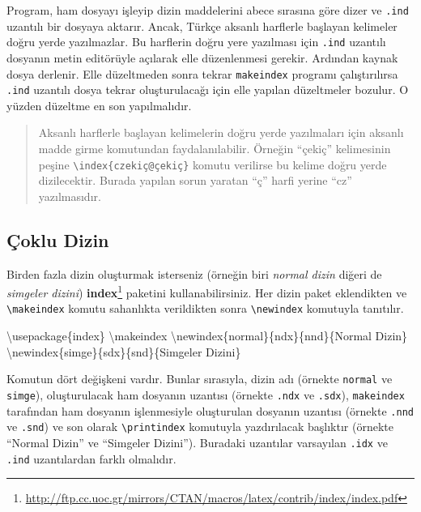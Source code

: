 \documentclass[
  10pt,
]{scrbook}
\newenvironment{Shaded}{\begin{snugshade}}{\end{snugshade}}
\newcommand{\BuiltInTok}[1]{#1}
\newcommand{\ExtensionTok}[1]{#1}
\newcommand{\FunctionTok}[1]{\textcolor[rgb]{0.00,0.00,0.00}{#1}}
\newcommand{\NormalTok}[1]{#1}
\renewcommand{\href}[2]{#2\footnote{\url{#1}}}
\theoremstyle{definition}
\theoremstyle{definition}
\theoremstyle{definition}
\theoremstyle{definition}
\theoremstyle{remark}
\begin{document}
Program, ham dosyayı işleyip dizin maddelerini abece sırasına göre dizer ve \texttt{.ind} uzantılı bir dosyaya aktarır. Ancak, Türkçe aksanlı harflerle başlayan kelimeler doğru yerde yazılmazlar. Bu harflerin doğru yere yazılması için \texttt{.ind} uzantılı dosyanın metin editörüyle açılarak elle düzenlenmesi gerekir. Ardından kaynak dosya derlenir. Elle düzeltmeden sonra tekrar \texttt{makeindex} programı çalıştırılırsa \texttt{.ind} uzantılı dosya tekrar oluşturulacağı için elle yapılan düzeltmeler bozulur. O yüzden düzeltme en son yapılmalıdır.

\begin{quote}
Aksanlı harflerle başlayan kelimelerin doğru yerde yazılmaları için aksanlı madde girme komutundan faydalanılabilir. Örneğin ``çekiç'' kelimesinin peşine \texttt{\textbackslash{}index\{czekiç@çekiç\}} komutu verilirse bu kelime doğru yerde dizilecektir. Burada yapılan sorun yaratan ``ç'' harfi yerine ``cz'' yazılmasıdır.
\end{quote}

\hypertarget{uxe7oklu-dizin}{%
\subsection{Çoklu Dizin}\label{uxe7oklu-dizin}}

Birden fazla dizin oluşturmak isterseniz (örneğin biri \emph{normal dizin} diğeri de \emph{simgeler dizini}) \href{http://ftp.cc.uoc.gr/mirrors/CTAN/macros/latex/contrib/index/index.pdf}{\textbf{index}} paketini kullanabilirsiniz. Her dizin paket eklendikten ve \texttt{\textbackslash{}makeindex} komutu sahanlıkta verildikten sonra \texttt{\textbackslash{}newindex} komutuyla tanıtılır.

\begin{Shaded}
\begin{Highlighting}[]
\BuiltInTok{\textbackslash{}usepackage}\NormalTok{\{}\ExtensionTok{index}\NormalTok{\}}
\FunctionTok{\textbackslash{}makeindex}
\FunctionTok{\textbackslash{}newindex}\NormalTok{\{normal\}\{ndx\}\{nnd\}\{Normal Dizin\}}
\FunctionTok{\textbackslash{}newindex}\NormalTok{\{simge\}\{sdx\}\{snd\}\{Simgeler Dizini\}}
\end{Highlighting}
\end{Shaded}

Komutun dört değişkeni vardır. Bunlar sırasıyla, dizin adı (örnekte \texttt{normal} ve \texttt{simge}), oluşturulacak ham dosyanın uzantısı (örnekte \texttt{.ndx} ve \texttt{.sdx}), \texttt{makeindex} tarafından ham dosyanın işlenmesiyle oluşturulan dosyanın uzantısı (örnekte \texttt{.nnd} ve \texttt{.snd}) ve son olarak \texttt{\textbackslash{}printindex} komutuyla yazdırılacak başlıktır (örnekte ``Normal Dizin'' ve ``Simgeler Dizini''). Buradaki uzantılar varsayılan \texttt{.idx} ve \texttt{.ind} uzantılardan farklı olmalıdır.
\end{document}
